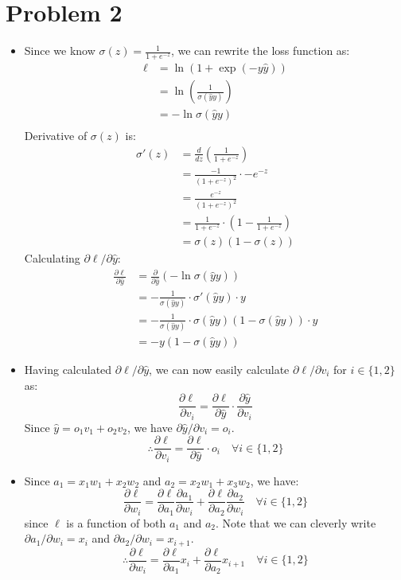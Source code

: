 \documentclass{article}
\begin{document}
\section{Problem 2}
  \begin{itemize}
    \item[\textbf{2.1}] Since we know $\sigma(z) = \frac{1}{1 + e^{-z}}$, we can rewrite the loss function as:
    \begin{align*}
      \ell &= \ln(1 + \exp(-y\hat{y})) \\
      &= \ln\left(\frac{1}{\sigma(\hat{y}y)}\right) \\
      &= -\ln \sigma(\hat{y}y) \\
    \end{align*}
    Derivative of $\sigma(z)$ is:
    \begin{align*}
      \sigma'(z) &= \frac{d}{dz} \left(\frac{1}{1 + e^{-z}}\right) \\
      &= \frac{-1}{(1 + e^{-z})^2} \cdot -e^{-z} \\
      &= \frac{e^{-z}}{(1 + e^{-z})^2} \\
      &= \frac{1}{1 + e^{-z}} \cdot \left(1 - \frac{1}{1 + e^{-z}}\right) \\
      &= \sigma(z) (1 - \sigma(z))
    \end{align*}
    Calculating $\partial\ell/\partial\hat{y}$:
    \begin{align*}
      \frac{\partial\ell}{\partial\hat{y}} &= \frac{\partial}{\partial\hat{y}} \left(-\ln \sigma(\hat{y}y)\right) \\
      &= -\frac{1}{\sigma(\hat{y}y)} \cdot \sigma'(\hat{y}y) \cdot y \\
      &= -\frac{1}{\sigma(\hat{y}y)} \cdot \sigma(\hat{y}y) (1 - \sigma(\hat{y}y)) \cdot y \\
      &= -y (1 - \sigma(\hat{y}y))
    \end{align*}

    \item[\textbf{2.2}] Having calculated $\partial\ell/\partial\hat{y}$, we can now easily calculate $\partial\ell/\partial v_i$ for $i \in \{1, 2\}$ as:
    \[ \frac{\partial\ell}{\partial v_i} = \frac{\partial\ell}{\partial\hat{y}} \cdot \frac{\partial\hat{y}}{\partial v_i} \]
    Since $\hat{y} = o_1v_1 + o_2v_2$, we have $\partial\hat{y}/\partial v_i = o_i$.
    \[ \therefore \frac{\partial\ell}{\partial v_i} = \frac{\partial\ell}{\partial\hat{y}} \cdot o_i \quad \forall i \in \{1, 2\} \]

    \item[\textbf{2.3}] Since $a_1 = x_1w_1 + x_2w_2$ and $a_2 = x_2w_1 + x_3w_2$, we have:
    \[ \frac{\partial\ell}{\partial w_i} = \frac{\partial\ell}{\partial a_1} \frac{\partial a_1}{\partial w_i} + \frac{\partial\ell}{\partial a_2} \frac{\partial a_2}{\partial w_i} \quad \forall i \in \{1, 2\} \]
    since $\ell$ is a function of both $a_1$ and $a_2$.
    Note that we can cleverly write $\partial a_1/\partial w_i = x_i$ and $\partial a_2/\partial w_i = x_{i+1}$.
    \[ \therefore \frac{\partial\ell}{\partial w_i} = \frac{\partial\ell}{\partial a_1} x_i + \frac{\partial\ell}{\partial a_2} x_{i+1} \quad \forall i \in \{1, 2\} \]


\end{itemize}
\end{document}
